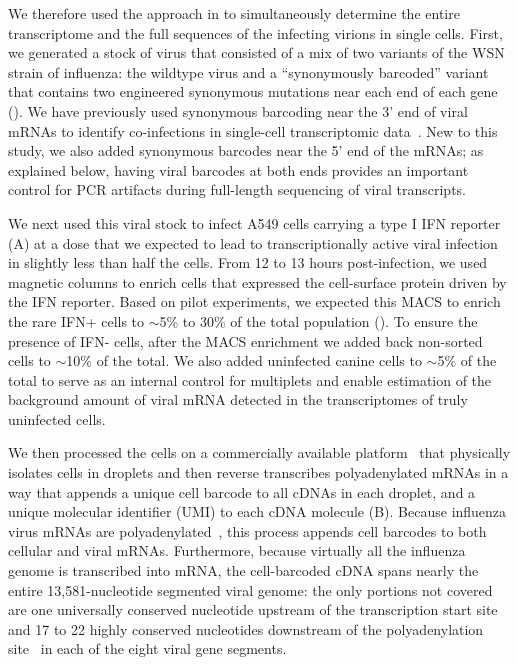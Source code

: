 \documentclass[9pt,lineno]{elife}
\begin{document}
We therefore used the approach in  to simultaneously determine the entire transcriptome and the full sequences of the infecting virions in single cells.
First, we generated a stock of virus that consisted of a mix of two variants of the WSN strain of influenza: the wildtype virus and a ``synonymously barcoded'' variant that contains two engineered synonymous mutations near each end of each gene ().
We have previously used synonymous barcoding near the 3' end of viral mRNAs to identify co-infections in single-cell transcriptomic data~\citep[about half of cells infected by multiple virions express a mix of wildtype and synonymously barcoded viral transcripts;][]{russell2018extreme}. 
New to this study, we also added synonymous barcodes near the 5' end of the mRNAs; as explained below, having viral barcodes at both ends provides an important control for PCR artifacts during full-length sequencing of viral transcripts.

We next used this viral stock to infect A549 cells carrying a type I IFN reporter (A) at a dose that we expected to lead to transcriptionally active viral infection in slightly less than half the cells.
From 12 to 13 hours post-infection, we used magnetic columns to enrich cells that expressed the cell-surface protein driven by the IFN reporter.
Based on pilot experiments, we expected this MACS to enrich the rare IFN+ cells to $\sim$5\% to 30\% of the total population ().
To ensure the presence of IFN- cells, after the MACS enrichment we added back non-sorted cells to $\sim$10\% of the total.
We also added uninfected canine cells to $\sim$5\% of the total to serve as an internal control for multiplets and enable estimation of the background amount of viral mRNA detected in the transcriptomes of truly uninfected cells.

We then processed the cells on a commercially available platform~\citep[the 10X Chromium;][]{zheng2017massively} that physically isolates cells in droplets and then reverse transcribes polyadenylated mRNAs in a way that appends a unique cell barcode to all cDNAs in each droplet, and a unique molecular identifier (UMI) to each cDNA molecule (B).
Because influenza virus mRNAs are polyadenylated~\citep{robertson1981polyadenylation}, this process appends cell barcodes to both cellular and viral mRNAs.
Furthermore, because virtually all the influenza genome is transcribed into mRNA, the cell-barcoded cDNA spans nearly the entire 13,581-nucleotide segmented viral genome: the only portions not covered are one universally conserved nucleotide upstream of the transcription start site~\citep{koppstein2015sequencing} and 17 to 22 highly conserved nucleotides downstream of the polyadenylation site~\citep{robertson1981polyadenylation} in each of the eight viral gene segments.
\end{document}
